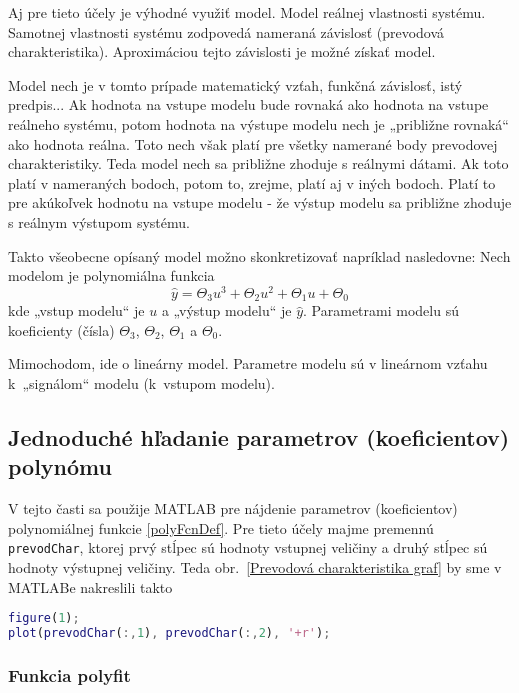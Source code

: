 \documentclass[a4paper, 10pt, ]{article}
\begin{document}
Aj pre tieto účely je výhodné využiť model. Model reálnej vlastnosti systému. Samotnej vlastnosti systému zodpovedá nameraná závislosť (prevodová charakteristika). Aproximáciou tejto závislosti je možné získať model.

Model nech je v tomto prípade matematický vzťah, funkčná závislosť, istý predpis... Ak hodnota na vstupe modelu bude rovnaká ako hodnota na vstupe reálneho systému, potom hodnota na výstupe modelu nech je „približne rovnaká“ ako hodnota reálna. Toto nech však platí pre všetky namerané body prevodovej charakteristiky. Teda model nech sa približne zhoduje s reálnymi dátami. Ak toto platí v nameraných bodoch, potom to, zrejme, platí aj v iných bodoch. Platí to pre akúkoľvek hodnotu na vstupe modelu - že výstup modelu sa približne zhoduje s reálnym výstupom systému.



Takto všeobecne opísaný model možno skonkretizovať napríklad nasledovne: Nech modelom je polynomiálna funkcia
\begin{equation} \label{polyFcnDef}
    \hat y = \Theta_3 u^3 + \Theta_2 u^2 + \Theta_1 u + \Theta_0
\end{equation}
kde „vstup modelu“ je $u$ a „výstup modelu“ je $\hat y$. Parametrami modelu sú koeficienty (čísla) $\Theta_3$, $\Theta_2$, $\Theta_1$ a $\Theta_0$.

Mimochodom, ide o lineárny model. Parametre modelu sú v lineárnom vzťahu k~„signálom“ modelu (k~vstupom modelu).



\subsection{Jednoduché hľadanie parametrov (koeficientov) polynómu}

V tejto časti sa použije MATLAB pre nájdenie parametrov (koeficientov) polynomiálnej funkcie \eqref{polyFcnDef}. Pre tieto účely majme premennú \verb|prevodChar|, ktorej prvý stĺpec sú hodnoty vstupnej veličiny a druhý stĺpec sú hodnoty výstupnej veličiny. Teda obr.~\ref{Prevodová charakteristika graf} by sme v MATLABe nakreslili takto
\begin{lstlisting}[language=Matlab, numbers=none]
figure(1);
plot(prevodChar(:,1), prevodChar(:,2), '+r');
\end{lstlisting}




\subsubsection{Funkcia polyfit}
\end{document}

